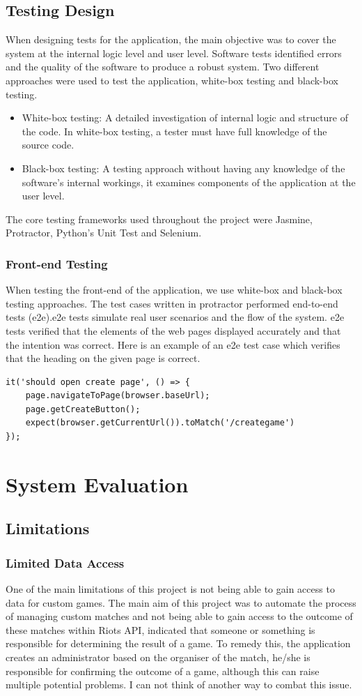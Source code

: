 \section{Testing Design}
When designing tests for the application, the main objective was to cover the system at the internal logic level and user level. Software tests identified errors and the quality of the software \cite{nidhra2012black} to produce a robust system. Two different approaches were used to test the application, white-box testing and black-box testing. 
\begin{itemize}
	\item White-box testing: A detailed investigation of internal logic and structure of the code. In white-box testing, a tester must have full knowledge of the source code.
	\item Black-box testing: A testing approach without having any knowledge of the software's internal workings, it examines components of the application at the user level.
\end{itemize}

The core testing frameworks used throughout the project were Jasmine, Protractor, Python's Unit Test and Selenium. 
\subsection{Front-end Testing}
When testing the front-end of the application, we use white-box and black-box testing approaches. The test cases written in protractor performed end-to-end tests (e2e).e2e tests simulate real user scenarios and the flow of the system. e2e tests verified that the elements of the web pages displayed accurately and that the intention was correct.
Here is an example of an e2e test case which verifies that the heading on the given page is correct.
\begin{verbatim}
it('should open create page', () => {
	page.navigateToPage(browser.baseUrl);
	page.getCreateButton();
	expect(browser.getCurrentUrl()).toMatch('/creategame')
});
\end{verbatim} 

\chapter{System Evaluation}
\section{Limitations}
\subsection{Limited Data Access}
One of the main limitations of this project is not being able to gain access to data for custom games. The main aim of this project was to automate the process of managing custom matches and not being able to gain access to the outcome of these matches within Riots API, indicated that someone or something is responsible for determining the result of a game. To remedy this, the application creates an administrator based on the organiser of the match, he/she is responsible for confirming the outcome of a game, although this can raise multiple potential problems. I can not think of another way to combat this issue.
\newpage
